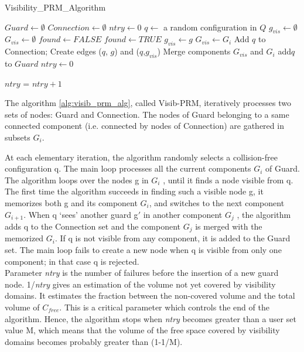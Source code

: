 \documentclass[11pt]{article}
\begin{document}
\begin{algorithm} 
\caption{Visibility\_PRM\_Algorithm} 
\label{alg:visib_prm_alg} 
  \begin{algorithmic}[1]

    \STATE $Guard \leftarrow \emptyset$ 
    \STATE $Connection \leftarrow \emptyset$
    \STATE $ntry \leftarrow 0$
    \STATE $q \leftarrow$ a random configuration in $Q$     
    \STATE $g_{vis} \leftarrow \emptyset$
    \STATE $G_{vis} \leftarrow \emptyset$
        \REPEAT
        \STATE $found \leftarrow FALSE$
                \STATE $found \leftarrow TRUE$
              \ENDIF
                  \STATE $g_{vis} \leftarrow g$
                  \STATE $G_{vis} \leftarrow G_{i}$
              \ELSE
                  \STATE Add $q$ to Connection;
                  \STATE Create edges ($q$, $g$) and ($q$,$g_{vis}$)
                  \STATE Merge components $G_{vis}$ and $G_{i}$
              \ENDIF
          \ENDFOR
              \STATE add{$q$} to $Guard$
              \STATE $ntry \leftarrow 0$

          \ELSE
              \STATE $ntry$ = $ntry+1$
          \ENDIF
      \ENDFOR
  \ENDWHILE
    \end{algorithmic}
\end{algorithm}


The algorithm \ref{alg:visib_prm_alg}, called Visib-PRM, iteratively processes two sets of nodes: Guard
and Connection. The nodes of Guard belonging to a same connected component
(i.e. connected by nodes of Connection) are gathered in subsets $G_i$.


At each elementary iteration, the algorithm randomly selects a collision-free
configuration q. The main loop processes all the current components $G_i$ of Guard. The algorithm loops over the nodes g in $G_i$ , until it finds a node visible from q. The
first time the algorithm succeeds in finding such a visible node g, it memorizes both
g and its component $G_i$, and switches to the next component $G_{i+1}$. When q ‘sees’
another guard g$'$ in another component $G_j$ , the algorithm adds q to the Connection
set and the component $G_j$ is merged with the memorized $G_i$. If q is not visible from
any component, it is added to the Guard set. The main loop fails to create a new
node when q is visible from only one component; in that case q is rejected.\\
Parameter \textit{ntry} is the number of failures before the insertion of a new guard node.
1/\textit{ntry} gives an estimation of the volume not yet covered by visibility domains.
It estimates the fraction between the non-covered volume and the total volume of
$C_{free}$. This is a critical parameter which controls the end of the algorithm. Hence,
the algorithm stops when \textit{ntry} becomes greater than a user set value M, which
means that the volume of the free space covered by visibility domains becomes
probably greater than (1-1/M).
\end{document}
